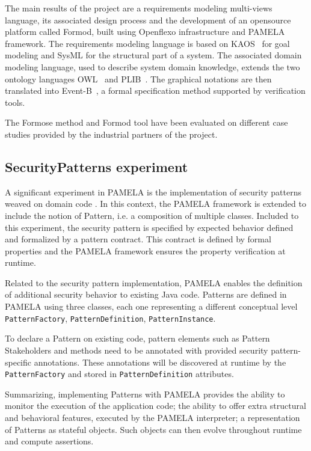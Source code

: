 The main results of the project are a requirements modeling multi-views
language, its associated design process and the development of an opensource
platform called Formod\cite{FormodWebSite}, built using Openflexo
infrastructure and PAMELA framework. 
The requirements modeling language is based on KAOS~\cite{kaos} for goal
modeling and SysML for the structural part of a system. The associated domain
modeling language, used to describe system domain knowledge, extends the two
ontology languages OWL~\cite{owl} and PLIB~\cite{plib}. The graphical notations
are then translated into Event-B~\cite{eventb}, a formal specification method supported by verification tools. 


The Formose method and Formod tool have been evaluated on different case studies provided by the industrial partners of the project.



\subsection{SecurityPatterns experiment}

A significant experiment in PAMELA is the implementation of security patterns weaved on domain code \cite{silva20}.
In this context, the PAMELA framework is extended to include the notion of Pattern, i.e. a composition of multiple classes. Included to this experiment, the security pattern is specified by expected behavior defined and formalized by a pattern contract. This contract is defined by formal properties and the PAMELA framework ensures the property verification at runtime.

Related to the security pattern implementation, PAMELA enables the definition of additional security behavior to existing Java code.
Patterns are defined in PAMELA using three classes, each one representing a different conceptual level \texttt{PatternFactory}, \texttt{PatternDefinition}, \texttt{PatternInstance}.

To declare a Pattern on existing code, pattern elements such as Pattern Stakeholders and methods need to be annotated with provided security pattern-specific annotations. These annotations will be discovered at runtime by the \texttt{PatternFactory} and stored in \texttt{PatternDefinition} attributes.


Summarizing, implementing Patterns with PAMELA provides the ability to monitor the execution of the application code; the ability to offer extra structural and behavioral features, executed by the PAMELA interpreter; a representation of Patterns as stateful objects. Such objects can then evolve throughout runtime and compute assertions.








